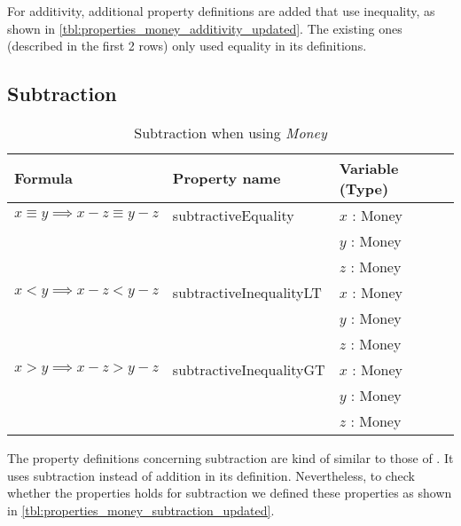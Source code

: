 \FloatBarrier\noindent
For additivity, additional property definitions are added that use inequality,
as shown in \autoref{tbl:properties_money_additivity_updated}. The existing ones
(described in the first 2 rows) only used equality in its definitions.

\subsection*{Subtraction}
\label{ssct:properties_subtraction_updated}
\begin{table}[!ht]
\centering
\begin{tabular}{lll}
\hline
                        \textbf{Formula}                         & \textbf{Property name}  & \textbf{Variable (Type)} \\ \hline
\rowcolor[HTML]{EFEFEF} $x \equiv y \implies x - z \equiv y - z$ & subtractiveEquality     & $x$ : Money              \\
\rowcolor[HTML]{EFEFEF}                                          &                         & $y$ : Money              \\
\rowcolor[HTML]{EFEFEF}                                          &                         & $z$ : Money              \\
                        $x < y \implies x - z < y - z$           & subtractiveInequalityLT & $x$ : Money              \\
                                                                 &                         & $y$ : Money              \\
                                                                 &                         & $z$ : Money              \\
\rowcolor[HTML]{EFEFEF} $x > y \implies x - z > y - z$           & subtractiveInequalityGT & $x$ : Money              \\
\rowcolor[HTML]{EFEFEF}                                          &                         & $y$ : Money              \\
\rowcolor[HTML]{EFEFEF}                                          &                         & $z$ : Money              \\ \hline
\end{tabular}
\caption{Subtraction when using \textit{Money}}
\label{tbl:properties_money_subtraction_updated}
\end{table}
\FloatBarrier\noindent
The property definitions concerning subtraction are kind of similar to those of
. It uses subtraction instead of
addition in its definition. Nevertheless, to check whether the properties holds
for subtraction we defined these properties as shown in
\autoref{tbl:properties_money_subtraction_updated}.


